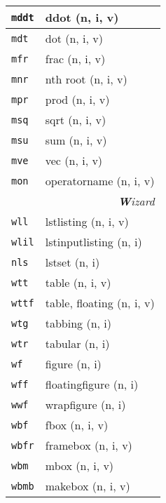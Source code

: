 \documentclass[oneside,10pt,landscape,DIV17]{scrartcl}
\newcommand{\Map}[1] {\textbf{\textasciiacute}\texttt{#1}}
\begin{document}
\begin{multicols}{3}
\begin{center}
\begin{tabular}[]{|p{11mm}|p{62mm}|}
\hline  \Map{mddt}& ddot                      \hfill (n, i, v)\\
\hline  \Map{mdt} & dot                       \hfill (n, i, v)\\
\hline  \Map{mfr} & frac                      \hfill (n, i, v)\\
\hline  \Map{mnr} & nth root                  \hfill (n, i, v)\\
\hline  \Map{mpr} & prod                      \hfill (n, i, v)\\
\hline  \Map{msq} & sqrt                      \hfill (n, i, v)\\
\hline  \Map{msu} & sum                       \hfill (n, i, v)\\
\hline  \Map{mve} & vec                       \hfill (n, i, v)\\
\hline  \Map{mon} & operatorname              \hfill (n, i, v)\\
\hline
\hline
\multicolumn{2}{|r|}{\textsl{\textbf{W}izard}}\\[1.0ex]
\hline  \Map{wll}  & lstlisting               \hfill (n, i, v)\\
\hline  \Map{wlil} & lstinputlisting          \hfill (n, i)\\
\hline  \Map{nls}  & lstset                   \hfill (n, i)\\
\hline
\hline  \Map{wtt}  & table                    \hfill (n, i, v)\\
\hline  \Map{wttf} & table, floating          \hfill (n, i, v)\\
\hline  \Map{wtg}  & tabbing                  \hfill (n, i)\\
\hline  \Map{wtr}  & tabular                  \hfill (n, i)\\
\hline
\hline  \Map{wf}   & figure                   \hfill (n, i)\\
\hline  \Map{wff}  & floatingfigure           \hfill (n, i)\\
\hline  \Map{wwf}  & wrapfigure               \hfill (n, i)\\
\hline
\hline  \Map{wbf}  & fbox                     \hfill (n, i, v)\\
\hline  \Map{wbfr} & framebox                 \hfill (n, i, v)\\
\hline  \Map{wbm}  & mbox                     \hfill (n, i, v)\\
\hline  \Map{wbmb} & makebox                  \hfill (n, i, v)\\

\end{tabular}
\end{center}
\end{multicols}
\end{document}
